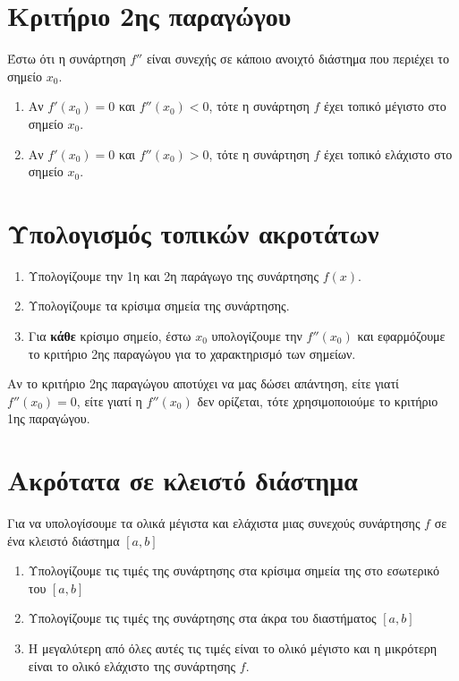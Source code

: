 \section*{Κριτήριο 2ης παραγώγου}
Έστω ότι η συνάρτηση $ f'' $ είναι συνεχής σε κάποιο ανοιχτό διάστημα που περιέχει 
το σημείο $ x_{0} $.

\begin{enumerate}
  \item Αν $ f'(x_{0}) = 0 $ και $ f''(x_{0}) < 0 $, τότε η συνάρτηση $f$ έχει 
    τοπικό μέγιστο στο σημείο $ x_{0} $.
  \item Αν $ f'(x_{0}) = 0 $ και $ f''(x_{0}) > 0 $, τότε η συνάρτηση $f$ έχει 
    τοπικό ελάχιστο στο σημείο $ x_{0} $.
\end{enumerate}

\section*{Υπολογισμός τοπικών ακροτάτων}
\begin{enumerate}
  \item Υπολογίζουμε την 1η και 2η παράγωγο της συνάρτησης $ f(x) $.
  \item Υπολογίζουμε τα κρίσιμα σημεία της συνάρτησης.
  \item Για \textbf{κάθε} κρίσιμο σημείο, έστω $ x_{0} $ υπολογίζουμε την 
    $ f''(x_{0}) $ και εφαρμόζουμε το κριτήριο 2ης παραγώγου για το χαρακτηρισμό των 
    σημείων.
\end{enumerate}

\begin{rem}
  Αν το κριτήριο 2ης παραγώγου αποτύχει να μας δώσει απάντηση, είτε γιατί 
  $ f''(x_{0}) = 0 $, είτε γιατί η $ f''(x_{0}) $ δεν ορίζεται, τότε χρησιμοποιούμε 
  το κριτήριο 1ης παραγώγου.
\end{rem}

\section*{Ακρότατα σε κλειστό διάστημα}

Για να υπολογίσουμε τα ολικά μέγιστα και ελάχιστα μιας συνεχούς συνάρτησης $f$ σε ένα 
κλειστό διάστημα $ [a,b] $
\begin{enumerate}
  \item Υπολογίζουμε τις τιμές της συνάρτησης στα κρίσιμα σημεία της στο εσωτερικό του 
    $ [a,b] $
  \item Υπολογίζουμε τις τιμές της συνάρτησης στα άκρα του διαστήματος $ [a,b] $
  \item Η μεγαλύτερη από όλες αυτές τις τιμές είναι το ολικό μέγιστο και η μικρότερη 
    είναι το ολικό ελάχιστο της συνάρτησης $f$.
\end{enumerate}




